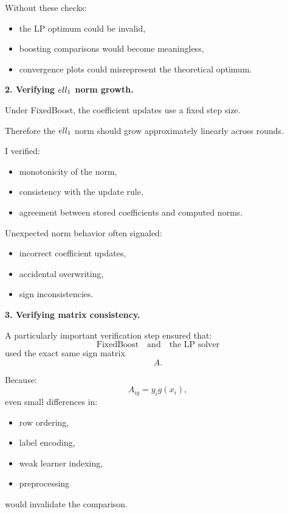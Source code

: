 \documentclass[11pt]{article}
\begin{document}
\begin{enumerate}
\begin{solutionbox}
Without these checks:
\begin{itemize}
    \item the LP optimum could be invalid,
    \item boosting comparisons would become meaningless,
    \item convergence plots could misrepresent the theoretical optimum.
\end{itemize}

\medskip

\textbf{2. Verifying $\\ell_1$ norm growth.}

Under FixedBoost, the coefficient updates use a fixed step size.

Therefore the $\\ell_1$ norm should grow approximately linearly across rounds.

I verified:
\begin{itemize}
    \item monotonicity of the norm,
    \item consistency with the update rule,
    \item agreement between stored coefficients and computed norms.
\end{itemize}

Unexpected norm behavior often signaled:
\begin{itemize}
    \item incorrect coefficient updates,
    \item accidental overwriting,
    \item sign inconsistencies.
\end{itemize}

\medskip

\textbf{3. Verifying matrix consistency.}

A particularly important verification step ensured that:
\[
\text{FixedBoost}
\quad\text{and}\quad
\text{the LP solver}
\]
used the exact same sign matrix
\[
A.
\]

Because:
\[
A_{ig}=y_ig(x_i),
\]
even small differences in:
\begin{itemize}
    \item row ordering,
    \item label encoding,
    \item weak learner indexing,
    \item preprocessing
\end{itemize}
would invalidate the comparison.


\end{solutionbox}
\end{enumerate}
\end{document}
